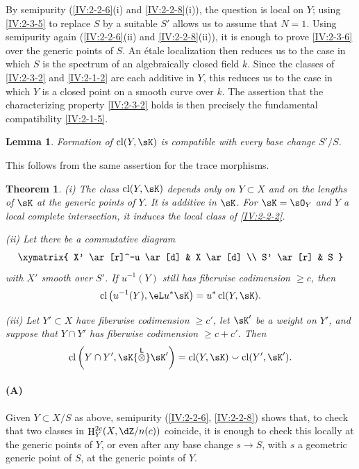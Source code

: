 \documentclass[12pt,oneside,english]{smfbook}
\DeclareMathOperator{\cl}{cl}
\DeclareMathOperator{\h}{H}
\newcounter{char}
\newcommand{\lotimes}{{\overset{\mathsf{L}}{\otimes}}}
\newtheorem{theorem}[subsubsection]{Theorem}
\newtheorem{lemma}[subsubsection]{Lemma}
\begin{document}
By semipurity (\ref{IV:2-2-6}(i) and \ref{IV:2-2-8}(i)), the question is local on $Y$; using \ref{IV:2-3-5} to replace $S$ by a suitable $S'$ allows us to assume that $N=1$. Using semipurity again (\ref{IV:2-2-6}(ii) and \ref{IV:2-2-8}(ii)), it is enough to prove \ref{IV:2-3-6} over the generic points of $S$. An étale localization then reduces us to the case in which $S$ is the spectrum of an algebraically closed field $k$. Since the classes of \ref{IV:2-3-2} and \ref{IV:2-1-2} are each additive in $Y$, this reduces us to the case in which $Y$ is a closed point on a smooth curve over $k$. The assertion that the characterizing property \ref{IV:2-3-2} holds is then precisely the fundamental compatibility \ref{IV:2-1-5}.

\begin{lemma}\label{IV:2-3-7}
Formation of $\cl(Y,\sK)$ is compatible with every base change $S'/S$.
\end{lemma}

This follows from the same assertion for the trace morphisms.

\begin{theorem}\label{IV:2-3-8}
(i) The class $\cl(Y,\sK)$ depends only on $Y\subset X$ and on the lengths of $\sK$ at the generic points of $Y$. It is additive in $\sK$. For $\sK=\sO_Y$ and $Y$ a local complete intersection, it induces the local class of \ref{IV:2-2-2}.

(ii) Let there be a commutative diagram
\[\xymatrix{
  X' \ar[r]^-u \ar[d]
    & X \ar[d] \\
  S' \ar[r]
    & S
}\]
with $X'$ smooth over $S'$. If $u^{-1}(Y)$ still has fiberwise codimension $\geqslant c$, then
\[
  \cl\left(u^{-1}(Y),\eL u^\ast\sK\right) = u^\ast \cl(Y,\sK) \text{.}
\]

(iii) Let $Y'\subset X$ have fiberwise codimension $\geqslant c'$, let $\sK'$ be a weight on $Y'$, and suppose that $Y\cap Y'$ has fiberwise codimension $\geqslant c+c'$. Then
\[
\cl\left(Y\cap Y',\sK\lotimes \sK'\right) = \cl(Y,\sK) \smallsmile \cl(Y',\sK') \text{.}
\]
\end{theorem}


\paragraph{(A)}
Given $Y\subset X/S$ as above, semipurity (\ref{IV:2-2-6}, \ref{IV:2-2-8}) shows that, to check that two classes in $\h_Y^{2c}(X,\dZ/n(c))$ coincide, it is enough to check this locally at the generic points of $Y$, or even after any base change $s\to S$, with $s$ a geometric generic point of $S$, at the generic points of $Y$.
\end{document}
